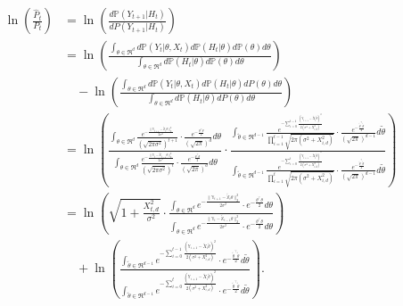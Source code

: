 \documentclass[twoside,11pt]{article}
\renewenvironment{proof}{\par\noindent{\bf Proof\ }}{\hfill\BlackBox\\[2mm]}
\newenvironment{proof}{\par\noindent{\bf Proof\ }}{\hfill\BlackBox\\[2mm]}
\def\proxytheta{\tilde{\theta}}
\def\Pr{\mathbb{P}}
\begin{document}
\begin{proof}
    \begin{align*}
        \ln\left(\frac{\hat{P}_t}{P_t}\right)
        & = \ln\left(\frac{d\Pr(Y_{t+1}|H_t)}{dP(Y_{t+1}|H_t)}\right)\\
        & = \ln\left(\frac{\int_{\theta\in\Re^d}d\Pr(Y_t|\theta, X_t)d\Pr(H_t|\theta)d\Pr(\theta)d\theta}{\int_{\theta\in\Re^d}d\Pr(H_t|\theta)d\Pr(\theta) d\theta}\right)\\
        &\quad - \ln\left(\frac{\int_{\theta\in\Re^d}d\Pr(Y_t|\theta, X_t)d\Pr(H_t|\theta)dP(\theta)d\theta}{\int_{\theta\in\Re^d}d\Pr(H_t|\theta)dP(\theta) d\theta}\right)\\
        & = \ln\left(\frac{\int_{\theta\in\Re^d}\frac{e^{-\frac{\|\mathbb{Y}_{t+1} - \tilde{\mathbb{X}}_{t}\theta\|^2_2}{2\sigma^2}}}{\left(\sqrt{2\pi \sigma^2}\right)^{t+1}}\cdot \frac{e^{-\frac{\theta^\top\theta}{2}}}{\left(\sqrt{2\pi}\right)^{d}}d\theta}{ \int_{\theta\in\Re^d}\frac{e^{-\frac{\|\mathbb{Y}_{t} - \tilde{\mathbb{X}}_{t-1}\theta\|^2_2}{2\sigma^2}}}{\left(\sqrt{2\pi\sigma^2}\right)^t}\cdot \frac{e^{-\frac{\theta^\top\theta}{2}}}{\left(\sqrt{2\pi}\right)^d}d\theta }\cdot \frac{\int_{\proxytheta\in\Re^{d-1}}\frac{e^{-\sum_{i=0}^{t-1}\frac{(\mathbb{Y}_{i+1} - \tilde{X}_{i}\proxytheta)^2}{2(\sigma^2 + X_{i,d}^2)}}}{\prod_{i=1}^{t-1}\sqrt{2\pi(\sigma^2 + X_{i,d}^2)}}\cdot \frac{e^{-\frac{\proxytheta^\top\proxytheta}{2}}}{\left(\sqrt{2\pi}\right)^{d-1}}d\proxytheta}{\int_{\proxytheta\in\Re^{d-1}}\frac{e^{-\sum_{i=0}^{t}\frac{(\mathbb{Y}_{i+1} - \tilde{X}_{i}\proxytheta)^2}{2(\sigma^2 + X_{i,d}^2)}}}{\prod_{i=1}^{t}\sqrt{2\pi(\sigma^2 + X_{i,d}^2)}}\cdot \frac{e^{-\frac{\proxytheta^\top\proxytheta}{2}}}{\left(\sqrt{2\pi}\right)^{d-1}}d\proxytheta}\right)\\
        & = \ln\left(\sqrt{1 + \frac{X_{t, d}^2}{\sigma^2}}\cdot\frac{\int_{\theta\in\Re^d}e^{-\frac{\|\mathbb{Y}_{t+1} - \tilde{\mathbb{X}}_{t}\theta\|^2_2}{2\sigma^2}}\cdot e^{-\frac{\theta^\top\theta}{2}}d\theta}{ \int_{\theta\in\Re^d}e^{-\frac{\|\mathbb{Y}_{t} - \tilde{\mathbb{X}}_{t-1}\theta\|^2_2}{2\sigma^2}}\cdot e^{-\frac{\theta^\top\theta}{2}}d\theta }\right)\\
        &\quad + \ln\left(
        \frac{\int_{\proxytheta\in\Re^{d-1}}e^{-\sum_{i=0}^{t-1}\frac{(\mathbb{Y}_{i+1} - \tilde{X}_{i}\proxytheta)^2}{2(\sigma^2 + X_{i,d}^2)}}\cdot e^{-\frac{\proxytheta^\top\proxytheta}{2}}d\proxytheta}{\int_{\proxytheta\in\Re^{d-1}}e^{-\sum_{i=0}^{t}\frac{(\mathbb{Y}_{i+1} - \tilde{X}_{i}\proxytheta)^2}{2(\sigma^2 + X_{i,d}^2)}}\cdot e^{-\frac{\proxytheta^\top\proxytheta}{2}}d\proxytheta}\right).\\
    \end{align*}
\end{proof}
\end{document}

